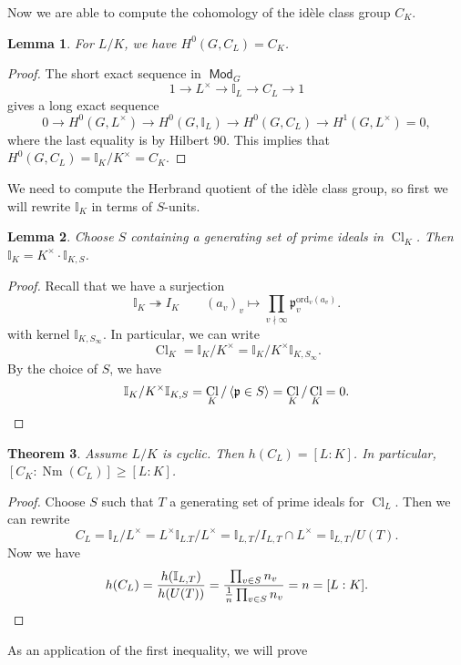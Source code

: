 \documentclass[leqno, openany]{memoir}
\newtheorem{thm}{Theorem}[section]
\newtheorem{lem}[thm]{Lemma}
\theoremstyle{definition}
\theoremstyle{remark}
\theoremstyle{plain}
\theoremstyle{definition}
\theoremstyle{remark}
\newcommand{\I}{\mathbb{I}}
\newcommand{\mf}[1]{\mathfrak{#1}}
\newcommand{\mr}[1]{\mathrm{#1}}
\DeclareMathOperator{\Cl}{Cl}
\DeclareMathOperator{\Mod}{\mathsf{Mod}}
\DeclareMathOperator{\Nm}{Nm}
\begin{document}
Now we are able to compute the cohomology of the id\`ele class group $C_K$. 

\begin{lem}
    For $L/K$, we have $H^0(G, C_L) = C_K$.
\end{lem}

\begin{proof}
    The short exact sequence in $\Mod_G$
    \[ 1 \to L^{\times} \to \I_L \to C_L \to 1 \]
    gives a long exact sequence
    \[ 0 \to H^0(G, L^{\times}) \to H^0(G, \I_L) \to H^0(G, C_L) \to H^1(G, L^{\times}) = 0, \]
    where the last equality is by Hilbert 90. This implies that $H^0(G, C_L) = \I_K/K^{\times} = C_K$.
\end{proof}

We need to compute the Herbrand quotient of the id\`ele class group, so first we will rewrite $\I_K$ in terms of $S$-units.

\begin{lem}
    Choose $S$ containing a generating set of prime ideals in $\Cl_K$. Then $\I_K = K^{\times} \cdot \I_{K, S}$.
\end{lem}

\begin{proof}
    Recall that we have a surjection 
    \[ \I_K \twoheadrightarrow I_K \qquad {(a_v)}_v \mapsto \prod_{v \nmid \infty} \mf{p}_v^{\mr{ord}_v(a_v)}. \]
    with kernel $\I_{K, S_{\infty}}$. In particular, we can write
    \[ \Cl_K = \I_K / K^{\times} = \I_K / K^{\times} \I_{K, S_{\infty}}. \]
    By the choice of $S$, we have
    \[ \I_K/K^{\times} \I_{K,S} = \Cl_K/\ev{\mf{p} \in S} = \Cl_K / \Cl_K = 0. \qedhere \]
\end{proof}

\begin{thm}
    Assume $L/K$ is cyclic. Then $h(C_L) = [L:K]$. In particular, $[C_K: \Nm(C_L)] \geq [L:K]$.
\end{thm}

\begin{proof}
    Choose $S$ such that $T$ a generating set of prime ideals for $\Cl_L$. Then we can rewrite
    \[ C_L = \I_L/L^{\times} = L^{\times} \I_{L.T}/L^{\times} = \I_{L,T}/I_{L,T} \cap L^{\times} = \I_{L,T}/U(T). \]
    Now we have 
    \[ h(C_L) = \frac{h(\I_{L, T})}{h(U(T))} = \frac{\prod_{v \in S} n_v}{\frac{1}{n} \prod_{v \in S} n_v} = n = [L:K]. \qedhere \]
\end{proof}

As an application of the first inequality, we will prove
\end{document}

